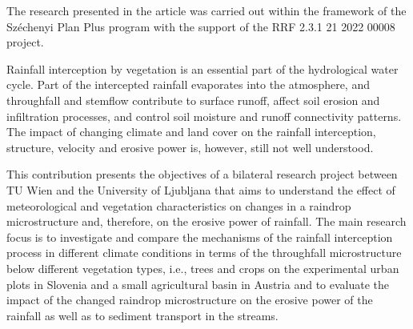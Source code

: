 The research presented in the article was carried out within the framework of the Széchenyi Plan Plus program with the support of the RRF 2.3.1 21 2022 00008 project. 






 
\newpage{}
{}
\begin{flushleft}







\end{flushleft}

\noindent

Rainfall interception by vegetation is an essential part of the hydrological water cycle. Part of the intercepted rainfall evaporates into the atmosphere, and throughfall and stemflow contribute to surface runoff, affect soil erosion and infiltration processes, and control soil moisture and runoff connectivity patterns. The impact of changing climate and land cover on the rainfall interception, structure, velocity and erosive power is, however, still not well understood. 

This contribution presents the objectives of a bilateral research project between TU Wien and the University of Ljubljana that aims to understand the effect of meteorological and vegetation characteristics on changes in a raindrop microstructure and, therefore, on the erosive power of rainfall. The main research focus is to investigate and compare the mechanisms of the rainfall interception process in different climate conditions in terms of the throughfall microstructure below different vegetation types, i.e., trees and crops on the experimental urban plots in Slovenia and a small agricultural basin in Austria and to evaluate the impact of the changed raindrop microstructure on the erosive power of the rainfall as well as to sediment transport in the streams. 

